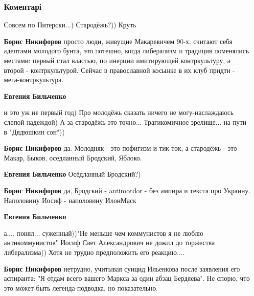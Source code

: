  
 
 
 
 
\subsubsection{Коментарі}

\begin{itemize} %
Совсем по Питерски...) Стародёжь?)) Круть

\begin{itemize} %
\textbf{Борис Никифоров} просто люди, живущие Макаревичем 90-х, считают себя адептами молодого бунта, это потешно, когда либерализм и традиция поменялись местами: первый стал властью, по инерции имитирующей контркультуру, а второй - контркультурой. Сейчас в православной косынке в их клуб придти - мега-контркультура.

\textbf{Евгения Бильченко} 

и это уж не первый год) Про молодёжь сказать ничего не могу-наслаждаюсь слепой
надеждой) А за стародёжь-это точно... Трагикомичное зрелище... на пути в
"Дядюшкин сон"))

\textbf{Борис Никифоров} да. Молодняк - это пофигизм и тик-ток, а стародёжь - это Макар, Быков, оседланный Бродский, Яблоко.

\textbf{Евгения Бильченко} Осёдланный Бродский?)


\textbf{Борис Никифоров} да, Бродский - antimordor - без ампира и текста про Украину. Наполовину Иосиф - наполовину ИлонМаск

\textbf{Евгения Бильченко} 

а.... понял... суженный))"Не меньше чем коммунистов я не люблю
антикоммунистов" Иосиф Свет Александрович не дожил до торжества
либерализма)) Хотя не трудно предположить его реакцию....

\textbf{Борис Никифоров} нетрудно, учитывая суицид Ильенкова после заявления его аспиранта: "Я отдам всего вашего Маркса за один абзац Бердяева". Не спорю, что это может быть легенда-подводка, но показательно.


\end{itemize}
\end{itemize}
